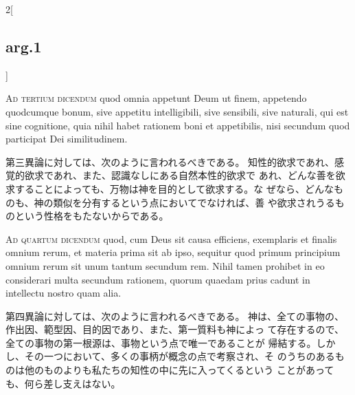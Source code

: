\documentclass[paper=a4paper,fontsize=10pt,jafontsize=9pt,titlepage]{jlreq}
\begin{document}
\begin{paracol}{2}[\subsection{arg.1}]
\switchcolumn*[\subsection{ad.3}]

{\scshape Ad tertium dicendum} quod omnia appetunt Deum
ut finem, appetendo quodcumque bonum, sive appetitu intelligibili, sive
sensibili, sive naturali, qui est sine cognitione, quia nihil habet
rationem boni et appetibilis, nisi secundum quod participat Dei
similitudinem.

\switchcolumn

第三異論に対しては、次のように言われるべきである。
知性的欲求であれ、感覚的欲求であれ、また、認識なしにある自然本性的欲求で
 あれ、どんな善を欲求することによっても、万物は神を目的として欲求する。な
 ぜなら、どんなものも、神の類似を分有するという点においてでなければ、善
 や欲求されうるものという性格をもたないからである。

\switchcolumn*[\subsection{ad.4}]

{\scshape Ad quartum dicendum} quod, cum Deus sit causa
efficiens, exemplaris et finalis omnium rerum, et materia prima sit ab
ipso, sequitur quod primum principium omnium rerum sit unum tantum
secundum rem. Nihil tamen prohibet in eo considerari multa secundum
rationem, quorum quaedam prius cadunt in intellectu nostro quam alia.

\switchcolumn

第四異論に対しては、次のように言われるべきである。
神は、全ての事物の、作出因、範型因、目的因であり、また、第一質料も神によっ
 て存在するので、全ての事物の第一根源は、事物という点で唯一であることが
 帰結する。しかし、その一つにおいて、多くの事柄が概念の点で考察され、そ
 のうちのあるものは他のものよりも私たちの知性の中に先に入ってくるという
 ことがあっても、何ら差し支えはない。

\end{paracol}
\end{document}
